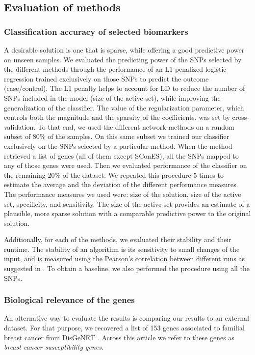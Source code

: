 \documentclass[twocolumn, 10pt]{article}
\begin{document}
\subsection{Evaluation of methods}
\subsubsection{Classification accuracy of selected biomarkers}
\label{methods:comparison}
A desirable solution is one that is sparse, while offering a good predictive power on unseen samples. We evaluated the predicting power of the SNPs selected by the different methods through the performance of an L1-penalized logistic regression trained exclusively on those SNPs to predict the outcome (case/control). The L1 penalty helps to account for LD to reduce the number of SNPs included in the model (size of the active set), while improving the generalization of the classifier. The value of the regularization parameter, which controls both the magnitude and the sparsity of the coefficients, was set by cross-validation. To that end, we used the different network-methods on a random subset of 80\% of the samples. On this same subset we trained our classifier exclusively on the SNPs selected by a particular method. When the method retrieved a list of genes (all of them except SConES), all the SNPs mapped to any of those genes were used. Then we evaluated performance of the classifier on the remaining 20\% of the dataset. We repeated this procedure 5 times to estimate the average and the deviation of the different performance measures. The performance measures we used were: size of the solution, size of the active set, specificity, and sensitivity. The size of the active set provides an estimate of a plausible, more sparse solution with a comparable predictive power to the original solution. 

Additionally, for each of the methods, we evaluated their stability and their runtime. The stability of an algorithm is its sensitivity to small changes of the input, and is measured using the Pearson's correlation between different runs as suggested in \cite{nogueira_measuring_2016}. To obtain a baseline, we also performed the procedure using all the SNPs.

\subsubsection{Biological relevance of the genes}
\label{methods:bcac}
An alternative way to evaluate the results is comparing our results to an external dataset. For that purpose, we recovered a list of 153 genes associated to familial breast cancer from DisGeNET \cite{pinero_disgenet:_2017}. Across this article we refer to these genes as \emph{breast cancer susceptibility genes}.
\end{document}
